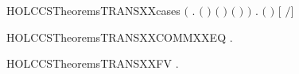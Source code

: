\begin{SaveVerbatim}{HOLCCSTheoremsTRANSXXcases}
       \ensuremath{(}\HOLSymConst{\HOLTokenExists{}}   .
            \ensuremath{(} \HOLSymConst{\ensuremath{=}}   \ensuremath{)} \HOLSymConst{\HOLTokenConj{}} \ensuremath{(} \HOLSymConst{\ensuremath{=}}   \ensuremath{)} \HOLSymConst{\HOLTokenConj{}}
            \ensuremath{(} \HOLSymConst{\ensuremath{=}}   \ensuremath{)} \HOLSymConst{\HOLTokenConj{}}  \HOLTokenTransBegin{}\HOLTokenTransEnd {}\ensuremath{)} \HOLSymConst{\HOLTokenDisj{}}
       \HOLSymConst{\HOLTokenExists{}} . \ensuremath{(} \HOLSymConst{\ensuremath{=}}   \ensuremath{)} \HOLSymConst{\HOLTokenConj{}} \ensuremath{[}  \ensuremath{/}\ensuremath{]}  \HOLTokenTransBegin{}\HOLTokenTransEnd {}
\end{SaveVerbatim}
\newcommand{\HOLCCSTheoremsTRANSXXcases}{\UseVerbatim{HOLCCSTheoremsTRANSXXcases}}
\begin{SaveVerbatim}{HOLCCSTheoremsTRANSXXCOMMXXEQ}
\HOLTokenTurnstile{} \HOLSymConst{\HOLTokenForall{}}   .  \HOLSymConst{\ensuremath{+}}  \HOLTokenTransBegin{}\HOLTokenTransEnd {} \HOLSymConst{\HOLTokenEquiv{}}  \HOLSymConst{\ensuremath{+}}  \HOLTokenTransBegin{}\HOLTokenTransEnd {}
\end{SaveVerbatim}
\newcommand{\HOLCCSTheoremsTRANSXXCOMMXXEQ}{\UseVerbatim{HOLCCSTheoremsTRANSXXCOMMXXEQ}}
\begin{SaveVerbatim}{HOLCCSTheoremsTRANSXXFV}
\HOLTokenTurnstile{} \HOLSymConst{\HOLTokenForall{}}  .  \HOLTokenTransBegin{}\HOLTokenTransEnd {} \HOLSymConst{\HOLTokenImp{}}   \HOLConst{\HOLTokenSubset{}}  
\end{SaveVerbatim}
